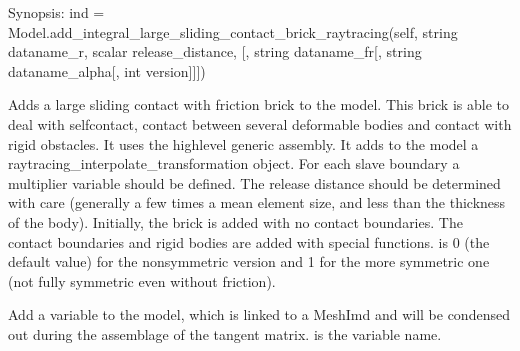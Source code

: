 \documentclass[a4paper,11pt,english]{sphinxmanual}
\begin{document}
\begin{fulllineitems}
\begin{fulllineitems}
\end{fulllineitems}


\begin{fulllineitems}
\label{\detokenize{python/cmdref_Model:getfem.Model.add_integral_large_sliding_contact_brick_raytracing}}
Synopsis: ind = Model.add\_integral\_large\_sliding\_contact\_brick\_raytracing(self, string dataname\_r, scalar release\_distance, {[}, string dataname\_fr{[}, string dataname\_alpha{[}, int version{]}{]}{]})

Adds a large sliding contact with friction brick to the model.
This brick is able to deal with self\sphinxhyphen{}contact, contact between
several deformable bodies and contact with rigid obstacles.
It uses the high\sphinxhyphen{}level generic assembly. It adds to the model
a raytracing\_interpolate\_transformation object.
For each slave boundary a multiplier variable should be defined.
The release distance should be determined with care
(generally a few times a mean element size, and less than the
thickness of the body). Initially, the brick is added with no contact
boundaries. The contact boundaries and rigid bodies are added with
special functions.  is 0 (the default value) for the
non\sphinxhyphen{}symmetric version and 1 for the more symmetric one
(not fully symmetric even without friction).

\end{fulllineitems}


\begin{fulllineitems}
\label{\detokenize{python/cmdref_Model:getfem.Model.add_internal_im_variable}}
Add a variable to the model, which is linked to a MeshImd and will be
condensed out during the assemblage of the tangent matrix.  is
the variable name.


\end{fulllineitems}
\end{fulllineitems}
\end{document}

